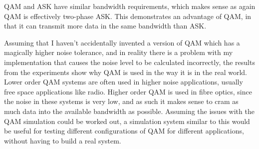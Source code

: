 \documentclass{article}
\begin{document}
QAM and ASK have similar bandwidth requirements, which makes sense as again QAM is effectively two-phase ASK. This demonstrates an advantage of QAM, in that it can transmit more data in the same bandwidth than ASK. 

Assuming that I haven't accidentally invented a version of QAM which has a magically higher noise tolerance, and in reality there is a problem with my implementation that causes the noise level to be calculated incorrectly, the results from the experiments show why QAM is used in the way it is in the real world. Lower order QAM systems are often used in higher noise applications, usually free space applications like radio. Higher order QAM is used in fibre optics, since the noise in these systems is very low, and as such it makes sense to cram as much data into the available bandwidth as possible. Assuming the issues with the QAM simulation could be worked out, a simulation system similar to this would be useful for testing different configurations of QAM for different applications, without having to build a real system.  
\end{document}
